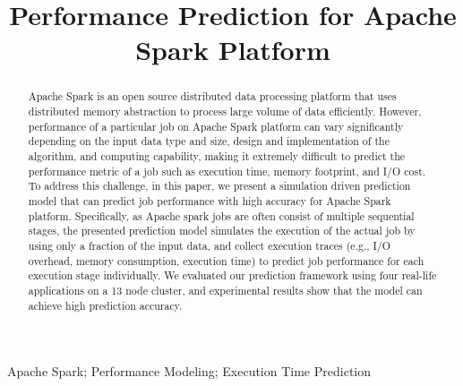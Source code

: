\documentclass[10pt, conference, compsocconf]{IEEEtran}
\begin{document}
\title{Performance Prediction for Apache Spark Platform}


\author{
\and
{}
}

\maketitle

\begin{abstract}
Apache Spark is an open source distributed data processing platform that uses distributed memory abstraction to process large volume of data efficiently. However, performance of a particular job on Apache Spark platform can vary significantly depending on the input data type and size, design and implementation of the algorithm, and computing capability, making it extremely difficult to predict the performance metric of a job such as execution time, memory footprint, and I/O cost. To address this challenge, in this paper, we present a simulation driven prediction model that can predict job performance with high accuracy for Apache Spark platform. Specifically, as Apache spark jobs are often consist of multiple sequential stages, the presented prediction model simulates the execution of the actual job by using only a fraction of the input data, and collect execution traces (e.g., I/O overhead, memory consumption, execution time) to predict job performance for each execution stage individually. We evaluated our prediction framework using four real-life applications on a 13 node cluster, and experimental results show that the model can achieve high prediction accuracy.


\end{abstract}
\begin{IEEEkeywords}
Apache Spark; Performance Modeling; Execution Time Prediction
\end{IEEEkeywords}


\IEEEpeerreviewmaketitle









\end{document}
